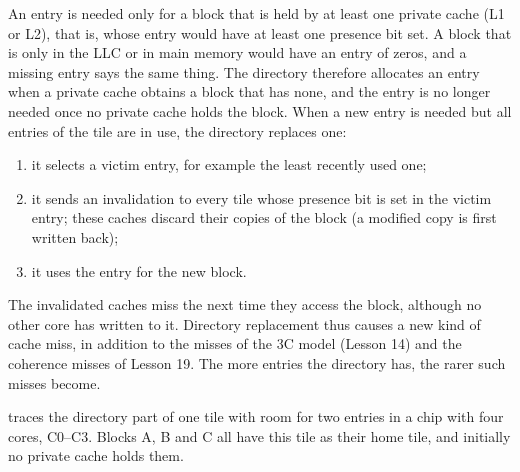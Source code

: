 \documentclass[../main.tex]{subfiles}
\begin{document}
An entry is needed only for a block that is held by at least one private
cache (L1 or L2), that is, whose entry would have at least one presence bit
set.  A block that is only in the LLC or in main
memory would have an entry of zeros, and a missing entry says the same thing.  The directory therefore
allocates an entry when a private cache obtains a block that has none, and
the entry is no longer needed once no private cache holds the block.  When a
new entry is needed but all entries of the tile are in use, the directory
replaces one:
\begin{enumerate}
  \item it selects a victim entry, for example the least recently used one;
  \item it sends an invalidation to every tile whose presence bit is set in
    the victim entry; these caches discard their copies of the block (a
    modified copy is first written back);
  \item it uses the entry for the new block.
\end{enumerate}
The invalidated caches miss the next time they access the block, although
no other core has written to it.  Directory replacement thus causes a new
kind of cache miss, in addition to the misses of the 3C model (Lesson 14)
and the coherence misses of Lesson 19.  The more entries the directory
has, the rarer such misses become.

\begin{example}
  \label{ex:l22-directory-trace}
   traces the directory part of one tile with
  room for two entries in a chip with four cores, C0--C3.  Blocks A, B and C
  all have this tile as their home tile, and initially no private cache holds
  them.
\end{example}
\end{document}
